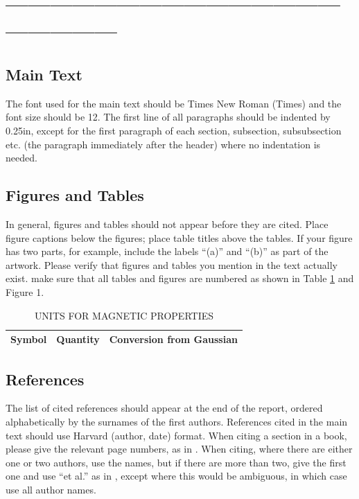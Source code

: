 \documentclass[conference]{IEEEtran}
\begin{document}


\nocite{*}

\iffalse
\section*{------------------------------------------------------------}

\subsection{Main Text}

The font used for the main text should be Times New Roman (Times) and the font size should be 12.  The first line of all paragraphs should be indented by 0.25in, except for the first paragraph of each section, subsection, subsubsection etc. (the paragraph immediately after the header) where no indentation is needed.

\subsection{Figures and Tables}
In general, figures and tables should not appear before they are cited.  Place figure captions below the figures; place table titles above the tables.  If your figure has two parts, for example, include the labels ``(a)'' and ``(b)'' as part of the artwork.  Please verify that figures and tables you mention in the text actually exist.  make sure that all tables and figures are numbered as shown in Table \ref{units} and Figure 1.

\begin{table}[htb]
\centering
\caption{UNITS FOR MAGNETIC PROPERTIES}
\vspace*{6pt}
\label{units}
\begin{tabular}{ccc}\hline\hline
Symbol & Quantity & Conversion from Gaussian \\ \hline
\end{tabular}
\end{table}

\subsection{References}

The list of cited references should appear at the end of the report, ordered alphabetically by the surnames of the first authors.  References cited in the main text should use Harvard (author, date) format.  When citing a section in a book, please give the relevant page numbers, as in \cite[p293]{budgen}.  When citing, where there are either one or two authors, use the names, but if there are more than two, give the first one and use ``et al.'' as in  , except where this would be ambiguous, in which case use all author names.
\end{document}
